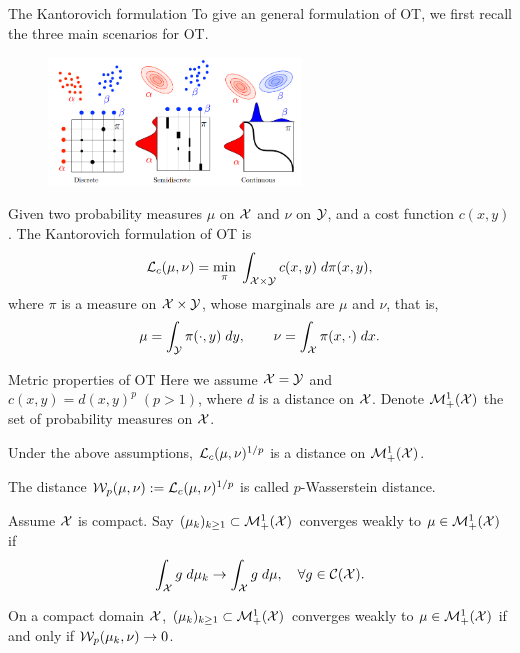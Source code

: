 \begin{frame}{The Kantorovich formulation}
    \footnotesize
    To give an general formulation of OT, 
    we first recall the three main scenarios for OT.

    \begin{figure}
        \captionsetup{font=scriptsize}
        \centering
        \includegraphics[width=0.6\textwidth]{png/3TypesOfOT.png}
    \end{figure}

    \pause
    Given two probability measures $\mu$ on $\mathcal{X}$ and $\nu$ on $\mathcal{Y}$, and a 
    cost function $c(x,y)$. 
    The Kantorovich formulation of OT is 
    \begin{equation}
        \mathcal{L}_c(\mu,\nu)=\min_\pi \; \int_{\mathcal{X}\times \mathcal{Y}} c(x,y) \;d\pi(x,y),
    \end{equation}
    where $\pi$ is a measure on $\mathcal{X}\times \mathcal{Y}$, whose
    marginals are $\mu$ and $\nu$, that is,
    \begin{equation}
        \mu = \int_{\mathcal{Y}} \pi(\cdot, y) \;dy,\qquad 
        \nu = \int_{\mathcal{X}} \pi(x, \cdot) \;dx.
    \end{equation}
\end{frame}

\begin{frame}{Metric properties of OT}
    \footnotesize
    Here we assume $\mathcal{X}=\mathcal{Y}$ and $c(x,y)=d(x,y)^p\;(p>1)$, where $d$ is a distance on $\mathcal{X}$.
    Denote $\mathcal{M}_+^1(\mathcal{X})$ the set of probability measures on $\mathcal{X}$.

    \pause
    \begin{Thm}
        Under the above assumptions, $\mathcal{L}_c(\mu,\nu)^{1/p}$ is a distance on $\mathcal{M}_+^1(\mathcal{X})$.
    \end{Thm}

    The distance $\mathcal{W}_p(\mu,\nu):=\mathcal{L}_c(\mu,\nu)^{1/p}$ is called $p$-Wasserstein distance.

    \pause

    \begin{Def}
        Assume $\mathcal{X}$ is compact. Say $(\mu_k)_{k\geq 1}\subset \mathcal{M}_+^1(\mathcal{X})$ converges
        weakly to $\mu\in\mathcal{M}_+^1(\mathcal{X})$ if
        \begin{equation}
            \int_{\mathcal{X}} g\;d\mu_k \to \int_{\mathcal{X}}g\;d\mu,\quad \forall g\in\mathcal{C}(\mathcal{X}).
        \end{equation}
    \end{Def}

    \begin{Thm}
        On a compact domain $\mathcal{X}$, $(\mu_k)_{k\geq 1}\subset \mathcal{M}_+^1(\mathcal{X})$ converges 
        weakly to $\mu\in\mathcal{M}_+^1(\mathcal{X})$ if and only if $\mathcal{W}_p(\mu_k,\nu)\to 0$.
    \end{Thm}
\end{frame}
